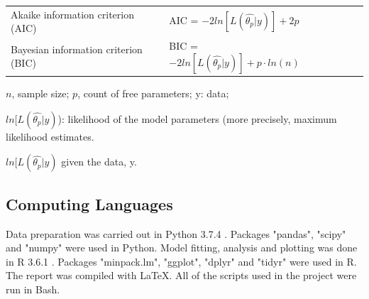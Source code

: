 \documentclass[a4paper,11pt]{article}
\theoremstyle{definition}
\begin{document}
\begin{linenumbers}
\begin{center}
\begin{table}[]
\begin{threeparttable}
{\begin{tabular}{@{}lllll@{}}
Akaike information criterion (AIC)   & AIC = $-2ln[L(\hat{\theta_p}|y)]+2p$  & \citealp{burnham2002practical} &  &  \\
Bayesian information criterion (BIC) & BIC = $-2ln[L(\hat{\theta_p}|y)]+p\cdot ln(n)$  & \citealp{schwarz1978estimating}   &  &  \\ \bottomrule
\end{tabular}}
 \begin{tablenotes}
        \footnotesize
        \item[] $n$, sample size; $p$, count of free parameters; y: data; 
        \item[] $ln[L(\hat{\theta_p}|y)$): likelihood of the model parameters (more precisely, maximum likelihood estimates.
        \item[] $ln[L(\hat{\theta_p}|y)$ given the data, y. 
      \end{tablenotes}
    \end{threeparttable}
\end{table}
\end{center}
\subsection{Computing Languages}
Data preparation was carried out in Python 3.7.4 \citep{python}. Packages "pandas"\citep{pd}, "scipy" and "numpy" \citep{numpy} were used in Python. Model fitting, analysis and plotting was done in R 3.6.1 \citep{R}. Packages "minpack.lm"\citep{minpack}, "ggplot"\citep{gg}, "dplyr"\citep{dplyr} and "tidyr" \citep{wickham2016package} were used in R. The report was compiled with {\LaTeX }. All of the scripts used in the project were run in Bash.


\end{linenumbers}
\end{document}
